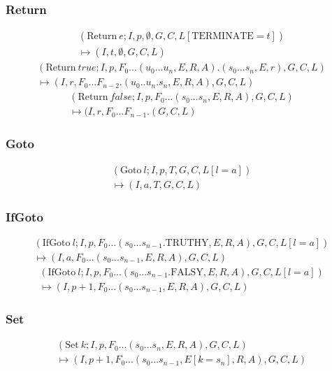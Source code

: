 \subsubsection{Return}
\begin{multline}
(\text{Return}\ e; I, p, \emptyset, G, C, L[\text{TERMINATE}=t]) \\ \mapsto (I, t, \emptyset, G, C, L)
\end{multline}
\begin{multline}
(\text{Return}\ {true}; I, p, F_0...(u_0...u_n, E, R, A).(s_0...s_n, E, r), G, C, L) \\ \mapsto (I, r, F_0...F_{n-2}.(u_0..u_n.s_n, E, R, A), G, C, L)
\end{multline}
\begin{multline}
(\text{Return}\ false; I, p, F_0...(s_0...s_n, E, R, A), G, C, L) \\ \mapsto (I, r, F_0...F_{n-1}.(G, C, L)
\end{multline}
\subsubsection{Goto}
\begin{multline}
(\text{Goto}\ l; I, p, T, G, C, L[l=a]) \\ \mapsto (I, a, T, G, C, L)
\end{multline}
\subsubsection{IfGoto}
\begin{multline}
(\text{IfGoto}\ l; I, p, F_0...(s_0...s_{n-1}.\text{TRUTHY}, E, R, A), G, C, L[l=a]) \\ \mapsto (I, a, F_0...(s_0...s_{n-1}, E, R, A), G, C, L)
\end{multline}
\begin{multline}
(\text{IfGoto}\ l; I, p, F_0...(s_0...s_{n-1}.\text{FALSY}, E, R, A), G, C, L[l=a]) \\ \mapsto (I, p+1, F_0...(s_0...s_{n-1}, E, R, A), G, C, L)
\end{multline}
\subsubsection{Set}
\begin{multline}
(\text{Set}\ k; I, p, F_0...(s_0...s_n, E, R, A), G, C, L) \\ \mapsto (I, p+1, F_0...(s_0...s_{n-1}, E[k=s_n], R, A), G, C, L)
\end{multline}
